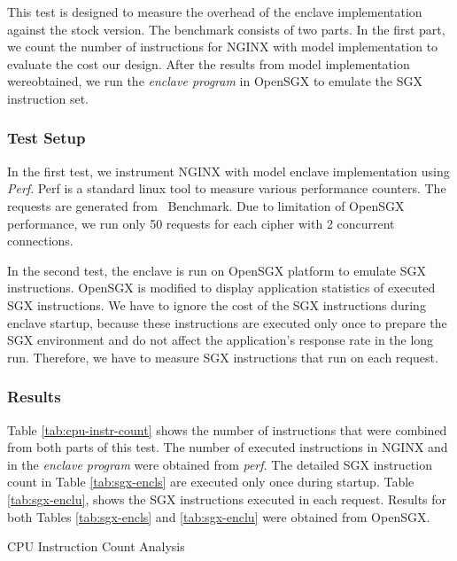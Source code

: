 \documentclass[../../../main.tex]{subfiles}
\begin{document}
\label{sec:cpu-instr-analysis}
This test is designed to measure the overhead of the enclave implementation
against the stock version. The benchmark consists of two parts.  In the first
part, we count the number of instructions for NGINX with model implementation
to evaluate the cost our design. After the results from model implementation
wereobtained, we run the \textit{enclave program} in OpenSGX to emulate the SGX
instruction set.

\subsubsection*{Test Setup}
In the first test, we instrument NGINX with model enclave implementation using
\textit{Perf}. Perf is a standard linux tool to measure various performance
counters. The requests are generated from \Apache~Benchmark. Due to limitation
of OpenSGX performance, we run only 50 requests for each cipher with 2
concurrent connections.

In the second test, the enclave is run on OpenSGX platform to emulate SGX
instructions. OpenSGX is modified to display application statistics of executed
SGX instructions. We have to ignore the cost of the SGX instructions during
enclave startup, because these instructions are executed only once to prepare
the SGX environment and do not affect the application's response rate in the
long run. Therefore, we have to measure SGX instructions that run on each
request.

\subsubsection*{Results}
Table \ref{tab:cpu-instr-count} shows the number of instructions that were
combined from both parts of this test. The number of executed instructions
in NGINX and in the \textit{enclave program} were obtained from \textit{perf}.
The detailed SGX instruction count in Table \ref{tab:sgx-encls} are executed
only once during startup. Table \ref{tab:sgx-enclu}, shows the SGX instructions
executed in each request. Results for both Tables \ref{tab:sgx-encls} and
\ref{tab:sgx-enclu} were obtained from OpenSGX.

\begin{table}[H]
  \caption{CPU Instruction Count Analysis}
  \label{tab:cpu-instr-count}
\end{table}
\end{document}
